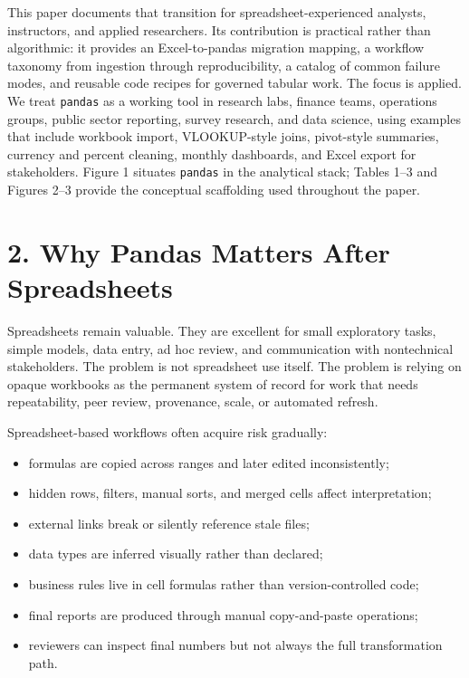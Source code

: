 \documentclass[
  12pt,
]{article}
\providecommand{\tightlist}{%
  \setlength{\itemsep}{0pt}\setlength{\parskip}{0pt}}
\begin{document}
This paper documents that transition for spreadsheet-experienced
analysts, instructors, and applied researchers. Its contribution is
practical rather than algorithmic: it provides an Excel-to-pandas
migration mapping, a workflow taxonomy from ingestion through
reproducibility, a catalog of common failure modes, and reusable code
recipes for governed tabular work. The focus is applied. We treat
\texttt{pandas} as a working tool in research labs, finance teams,
operations groups, public sector reporting, survey research, and data
science, using examples that include workbook import, VLOOKUP-style
joins, pivot-style summaries, currency and percent cleaning, monthly
dashboards, and Excel export for stakeholders. Figure 1 situates
\texttt{pandas} in the analytical stack; Tables 1--3 and Figures 2--3
provide the conceptual scaffolding used throughout the paper.

\section{2. Why Pandas Matters After
Spreadsheets}\label{why-pandas-matters-after-spreadsheets}

Spreadsheets remain valuable. They are excellent for small exploratory
tasks, simple models, data entry, ad hoc review, and communication with
nontechnical stakeholders. The problem is not spreadsheet use itself.
The problem is relying on opaque workbooks as the permanent system of
record for work that needs repeatability, peer review, provenance,
scale, or automated refresh.

Spreadsheet-based workflows often acquire risk gradually:

\begin{itemize}
\tightlist
\item
  formulas are copied across ranges and later edited inconsistently;
\item
  hidden rows, filters, manual sorts, and merged cells affect
  interpretation;
\item
  external links break or silently reference stale files;
\item
  data types are inferred visually rather than declared;
\item
  business rules live in cell formulas rather than version-controlled
  code;
\item
  final reports are produced through manual copy-and-paste operations;
\item
  reviewers can inspect final numbers but not always the full
  transformation path.
\end{itemize}
\end{document}
